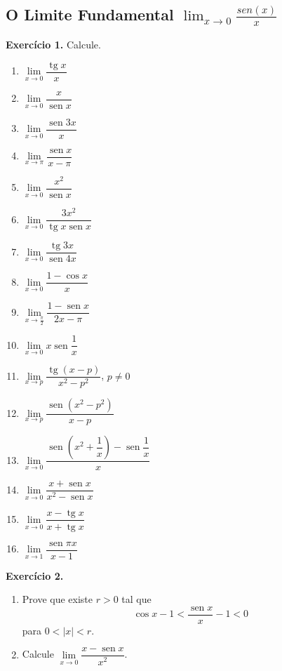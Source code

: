 \documentclass[12pt,a4paper]{article}
\begin{document}
\subsection{O Limite Fundamental $\lim_{x \to 0} \frac{sen(x)}{x}$}
\vspace{0.5cm}
\noindent\textbf{Exercício 1.} Calcule.
\begin{enumerate}
    \renewcommand{\theenumi}{\alph{enumi}}
    \renewcommand{\labelenumi}{\theenumi)}
    \item $\lim\limits_{x \to 0} \dfrac{\operatorname{tg} x}{x}$
    \item $\lim\limits_{x \to 0} \dfrac{x}{\operatorname{sen} x}$
    \item $\lim\limits_{x \to 0} \dfrac{\operatorname{sen} 3x}{x}$
    \item $\lim\limits_{x \to \pi} \dfrac{\operatorname{sen} x}{x - \pi}$
    \item $\lim\limits_{x \to 0} \dfrac{x^2}{\operatorname{sen} x}$
    \item $\lim\limits_{x \to 0} \dfrac{3x^2}{\operatorname{tg} x \operatorname{sen} x}$
    \item $\lim\limits_{x \to 0} \dfrac{\operatorname{tg} 3x}{\operatorname{sen} 4x}$
    \item $\lim\limits_{x \to 0} \dfrac{1 - \cos x}{x}$
    \item $\lim\limits_{x \to \frac{\pi}{2}} \dfrac{1 - \operatorname{sen} x}{2x - \pi}$
    \item $\lim\limits_{x \to 0} x \operatorname{sen}\dfrac{1}{x}$
    \item $\lim\limits_{x \to p} \dfrac{\operatorname{tg}(x - p)}{x^2 - p^2}$, $p \neq 0$
    \item $\lim\limits_{x \to p} \dfrac{\operatorname{sen}(x^2 - p^2)}{x - p}$
    \item $\lim\limits_{x \to 0} \dfrac{\operatorname{sen}\!\left(x^2 + \dfrac{1}{x}\right) - \operatorname{sen}\dfrac{1}{x}}{x}$
    \item $\lim\limits_{x \to 0} \dfrac{x + \operatorname{sen} x}{x^2 - \operatorname{sen} x}$
    \item $\lim\limits_{x \to 0} \dfrac{x - \operatorname{tg} x}{x + \operatorname{tg} x}$
    \item $\lim\limits_{x \to 1} \dfrac{\operatorname{sen}\pi x}{x - 1}$
\end{enumerate}

\vspace{0.5cm}
\noindent\textbf{Exercício 2.}
\begin{enumerate}
    \renewcommand{\theenumi}{\alph{enumi}}
    \renewcommand{\labelenumi}{\theenumi)}
    \item Prove que existe $r > 0$ tal que
    \[
    \cos x - 1 < \dfrac{\operatorname{sen} x}{x} - 1 < 0
    \]
    para $0 < |x| < r$.
    \item Calcule $\lim\limits_{x \to 0} \dfrac{x - \operatorname{sen} x}{x^2}$.
\end{enumerate}
\end{document}
